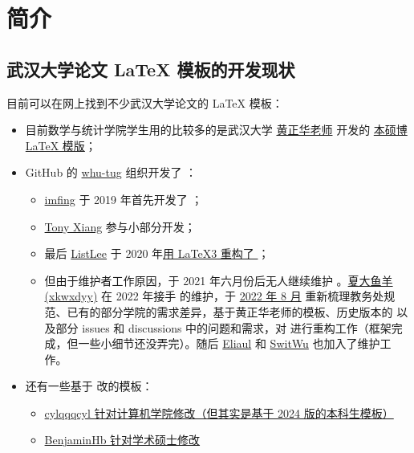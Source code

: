 
\chapter{简介}


\section{武汉大学论文 \LaTeX{} 模板的开发现状}

目前可以在网上找到不少武汉大学论文的 \LaTeX{} 模板：
\begin{itemize}
  \item 目前数学与统计学院学生用的比较多的是武汉大学 \href{http://aff.whu.edu.cn/huangzh/}{黄正华老师} 开发的 \href{http://aff.whu.edu.cn/huangzh/#:~:text=%E4%B8%8B%E5%88%97-,%E6%AF%95%E4%B8%9A%E8%AE%BA%E6%96%87%E6%A8%A1%E6%9D%BF,-%2C%20%E9%80%82%E7%94%A8%E4%BA%8E%20TeX}{本硕博 \LaTeX{} 模版}；
  \item GitHub 的 \href{https://github.com/whutug}{whu-tug} 组织开发了 \href{https://github.com/whutug/whu-thesis}{}：
    \begin{itemize}
      \item \href{https://github.com/imfing}{imfing} 于 2019 年首先开发了 ；
      \item \href{https://github.com/T0nyX1ang}{Tony Xiang} 参与小部分开发；
      \item 最后 \href{https://github.com/tanukihee}{ListLee} 于 2020 年\href{https://github.com/whutug/whu-thesis/commit/d488438b7819ddf5a128081a50b118d8fd4ec1ef}{用 \LaTeX3 重构了 }；
      \item 但由于维护者工作原因，于 2021 年六月份后无人继续维护 。\href{https://github.com/xkwxdyy}{夏大鱼羊(xkwxdyy)} 在 2022 年接手  的维护，于 \href{https://github.com/whutug/whu-thesis/commit/bfaf2c235e7490fa16ce40ec6eb20ce060592a9d}{2022 年 8 月} 重新梳理教务处规范、已有的部分学院的需求差异，基于黄正华老师的模板、历史版本的  以及部分 issues 和 discussions 中的问题和需求，对  进行重构工作（框架完成，但一些小细节还没弄完）。随后 \href{https://github.com/Eliaul}{Eliaul} 和 \href{https://github.com/SwitWu}{SwitWu} 也加入了维护工作。
    \end{itemize}
  \item 还有一些基于  改的模板：
    \begin{itemize}
      \item \href{https://github.com/cylqqqcyl/whu-thesis-2024}{cylqqqcyl 针对计算机学院修改（但其实是基于 2024 版的本科生模板）}
      \item \href{https://github.com/BenjaminHb/whu-thesis}{BenjaminHb 针对学术硕士修改}
    \end{itemize}
\end{itemize}


